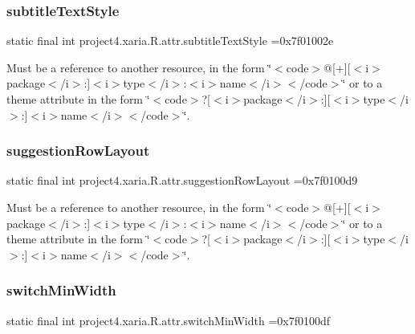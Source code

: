 \subsubsection{\texorpdfstring{subtitle\+Text\+Style}{subtitleTextStyle}}
{\footnotesize\ttfamily static final int project4.\+xaria.\+R.\+attr.\+subtitle\+Text\+Style =0x7f01002e\hspace{0.3cm}{\ttfamily [static]}}

Must be a reference to another resource, in the form \char`\"{}$<$code$>$@\mbox{[}+\mbox{]}\mbox{[}$<$i$>$package$<$/i$>$\+:\mbox{]}$<$i$>$type$<$/i$>$\+:$<$i$>$name$<$/i$>$$<$/code$>$\char`\"{} or to a theme attribute in the form \char`\"{}$<$code$>$?\mbox{[}$<$i$>$package$<$/i$>$\+:\mbox{]}\mbox{[}$<$i$>$type$<$/i$>$\+:\mbox{]}$<$i$>$name$<$/i$>$$<$/code$>$\char`\"{}. \mbox{\label{classproject4_1_1xaria_1_1R_1_1attr_a1fb6b8140eb66beeab933d6152af10c3}} 
\subsubsection{\texorpdfstring{suggestion\+Row\+Layout}{suggestionRowLayout}}
{\footnotesize\ttfamily static final int project4.\+xaria.\+R.\+attr.\+suggestion\+Row\+Layout =0x7f0100d9\hspace{0.3cm}{\ttfamily [static]}}

Must be a reference to another resource, in the form \char`\"{}$<$code$>$@\mbox{[}+\mbox{]}\mbox{[}$<$i$>$package$<$/i$>$\+:\mbox{]}$<$i$>$type$<$/i$>$\+:$<$i$>$name$<$/i$>$$<$/code$>$\char`\"{} or to a theme attribute in the form \char`\"{}$<$code$>$?\mbox{[}$<$i$>$package$<$/i$>$\+:\mbox{]}\mbox{[}$<$i$>$type$<$/i$>$\+:\mbox{]}$<$i$>$name$<$/i$>$$<$/code$>$\char`\"{}. \mbox{\label{classproject4_1_1xaria_1_1R_1_1attr_a52a618aeddd088b56bd168027af2f1eb}} 
\subsubsection{\texorpdfstring{switch\+Min\+Width}{switchMinWidth}}
{\footnotesize\ttfamily static final int project4.\+xaria.\+R.\+attr.\+switch\+Min\+Width =0x7f0100df\hspace{0.3cm}{\ttfamily [static]}}

